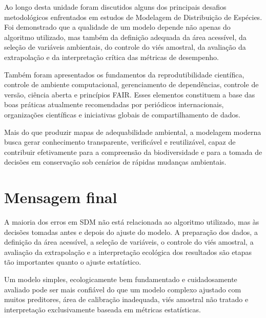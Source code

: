 Ao longo desta unidade foram discutidos alguns dos principais desafios
metodológicos enfrentados em estudos de Modelagem de Distribuição de Espécies.
Foi demonstrado que a qualidade de um modelo depende não apenas do algoritmo
utilizado, mas também da definição adequada da área acessível, da seleção de
variáveis ambientais, do controle do viés amostral, da avaliação da
extrapolação e da interpretação crítica das métricas de desempenho.

Também foram apresentados os fundamentos da reprodutibilidade científica,
controle de ambiente computacional, gerenciamento de dependências, controle de
versão, ciência aberta e princípios FAIR. Esses elementos constituem a base das
boas práticas atualmente recomendadas por periódicos internacionais,
organizações científicas e iniciativas globais de compartilhamento de dados.

Mais do que produzir mapas de adequabilidade ambiental, a modelagem moderna
busca gerar conhecimento transparente, verificável e reutilizável, capaz de
contribuir efetivamente para a compreensão da biodiversidade e para a tomada de
decisões em conservação sob cenários de rápidas mudanças ambientais.

\section{Mensagem final}

A maioria dos erros em SDM não está relacionada ao algoritmo utilizado, mas às
decisões tomadas antes e depois do ajuste do modelo. A preparação dos dados, a
definição da área acessível, a seleção de variáveis, o controle do viés
amostral, a avaliação da extrapolação e a interpretação ecológica dos
resultados são etapas tão importantes quanto o ajuste estatístico.

\begin{sdmkeybox}
	Um modelo simples, ecologicamente bem fundamentado e cuidadosamente avaliado
	pode ser mais confiável do que um modelo complexo ajustado com muitos
	preditores, área de calibração inadequada, viés amostral não tratado e
	interpretação exclusivamente baseada em métricas estatísticas.
\end{sdmkeybox}

